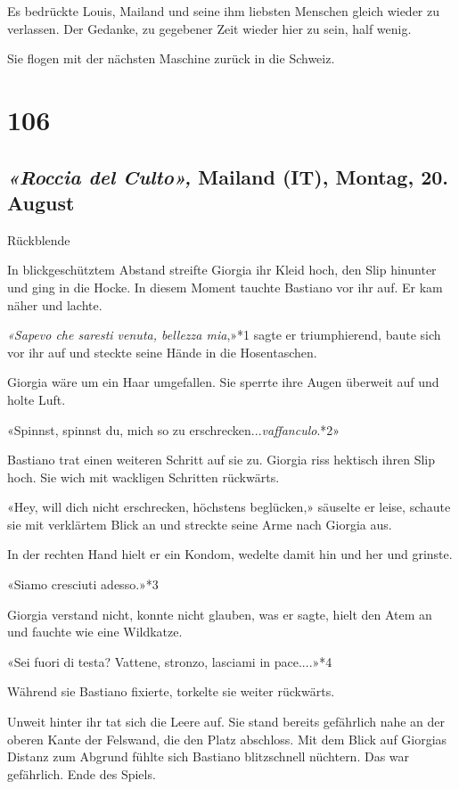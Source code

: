 Es bedrückte Louis, Mailand und seine ihm liebsten Menschen gleich
wieder zu verlassen. Der Gedanke, zu gegebener Zeit wieder hier zu sein,
half wenig.

Sie flogen mit der nächsten Maschine zurück in die Schweiz.

\chapter{106}\label{section-106}

\section{\texorpdfstring{\emph{«Roccia del Culto»,} Mailand (IT),
Montag, 20. August
}{«Roccia del Culto», Mailand (IT), Montag, 20. August }}\label{roccia-del-culto-mailand-it-montag-20.-august-1}

Rückblende

In blickgeschütztem Abstand streifte Giorgia ihr Kleid hoch, den Slip
hinunter und ging in die Hocke. In diesem Moment tauchte Bastiano vor
ihr auf. Er kam näher und lachte.

\emph{«Sapevo che saresti venuta, bellezza mia},»*1 sagte er
triumphierend, baute sich vor ihr auf und steckte seine Hände in die
Hosentaschen.

Giorgia wäre um ein Haar umgefallen. Sie sperrte ihre Augen überweit auf
und holte Luft.

«Spinnst, spinnst du, mich so zu erschrecken...\emph{vaffanculo}.*2»

Bastiano trat einen weiteren Schritt auf sie zu. Giorgia riss hektisch
ihren Slip hoch. Sie wich mit wackligen Schritten rückwärts.

«Hey, will dich nicht erschrecken, höchstens beglücken,» säuselte er
leise, schaute sie mit verklärtem Blick an und streckte seine Arme nach
Giorgia aus.

In der rechten Hand hielt er ein Kondom, wedelte damit hin und her und
grinste.

«Siamo cresciuti adesso.»*3

Giorgia verstand nicht, konnte nicht glauben, was er sagte, hielt den
Atem an und fauchte wie eine Wildkatze.

«Sei fuori di testa? Vattene, stronzo, lasciami in pace....»*4

Während sie Bastiano fixierte, torkelte sie weiter rückwärts.

Unweit hinter ihr tat sich die Leere auf. Sie stand bereits gefährlich
nahe an der oberen Kante der Felswand, die den Platz abschloss. Mit dem
Blick auf Giorgias Distanz zum Abgrund fühlte sich Bastiano blitzschnell
nüchtern. Das war gefährlich. Ende des Spiels.


